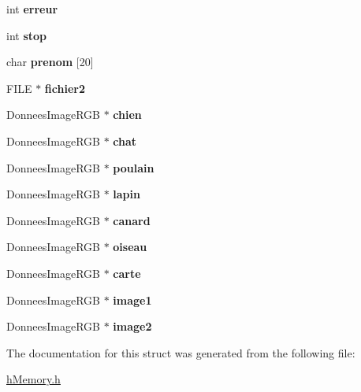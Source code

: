 \begin{DoxyCompactItemize}
\item 
int {\bfseries erreur}\hypertarget{structMEMORY_af86682453d5ac761179a10bf220efcda}{}\label{structMEMORY_af86682453d5ac761179a10bf220efcda}

\item 
int {\bfseries stop}\hypertarget{structMEMORY_aeebed2e935c7e36b7ee23a5f699dae0b}{}\label{structMEMORY_aeebed2e935c7e36b7ee23a5f699dae0b}

\item 
char {\bfseries prenom} \mbox{[}20\mbox{]}\hypertarget{structMEMORY_a198da4f63995c7110ed3e42fdc32f7d9}{}\label{structMEMORY_a198da4f63995c7110ed3e42fdc32f7d9}

\item 
F\+I\+LE $\ast$ {\bfseries fichier2}\hypertarget{structMEMORY_afabf30b4fcf1f06c4cf47eaf628cdcf8}{}\label{structMEMORY_afabf30b4fcf1f06c4cf47eaf628cdcf8}

\item 
Donnees\+Image\+R\+GB $\ast$ {\bfseries chien}\hypertarget{structMEMORY_ae2a24932d95d3471ca22312607e9c8ea}{}\label{structMEMORY_ae2a24932d95d3471ca22312607e9c8ea}

\item 
Donnees\+Image\+R\+GB $\ast$ {\bfseries chat}\hypertarget{structMEMORY_aafcf74c8369143ffe284e83c295e0fa6}{}\label{structMEMORY_aafcf74c8369143ffe284e83c295e0fa6}

\item 
Donnees\+Image\+R\+GB $\ast$ {\bfseries poulain}\hypertarget{structMEMORY_a572b438e4f8957f895af92c519854545}{}\label{structMEMORY_a572b438e4f8957f895af92c519854545}

\item 
Donnees\+Image\+R\+GB $\ast$ {\bfseries lapin}\hypertarget{structMEMORY_a84938c5ea87d14e0940633961e8eb23a}{}\label{structMEMORY_a84938c5ea87d14e0940633961e8eb23a}

\item 
Donnees\+Image\+R\+GB $\ast$ {\bfseries canard}\hypertarget{structMEMORY_a02eed805b98956fcfea73356a6f63550}{}\label{structMEMORY_a02eed805b98956fcfea73356a6f63550}

\item 
Donnees\+Image\+R\+GB $\ast$ {\bfseries oiseau}\hypertarget{structMEMORY_a853ccda79bf8cf059379233d9c232a94}{}\label{structMEMORY_a853ccda79bf8cf059379233d9c232a94}

\item 
Donnees\+Image\+R\+GB $\ast$ {\bfseries carte}\hypertarget{structMEMORY_a39611f9b9e8dbbb311fb449f92442f49}{}\label{structMEMORY_a39611f9b9e8dbbb311fb449f92442f49}

\item 
Donnees\+Image\+R\+GB $\ast$ {\bfseries image1}\hypertarget{structMEMORY_a263aa21ffb4551879e1307457f535331}{}\label{structMEMORY_a263aa21ffb4551879e1307457f535331}

\item 
Donnees\+Image\+R\+GB $\ast$ {\bfseries image2}\hypertarget{structMEMORY_a353796df027997b4cfdeb121828fd1b6}{}\label{structMEMORY_a353796df027997b4cfdeb121828fd1b6}

\end{DoxyCompactItemize}


The documentation for this struct was generated from the following file\+:\begin{DoxyCompactItemize}
\item 
\hyperlink{hMemory_8h}{h\+Memory.\+h}\end{DoxyCompactItemize}
